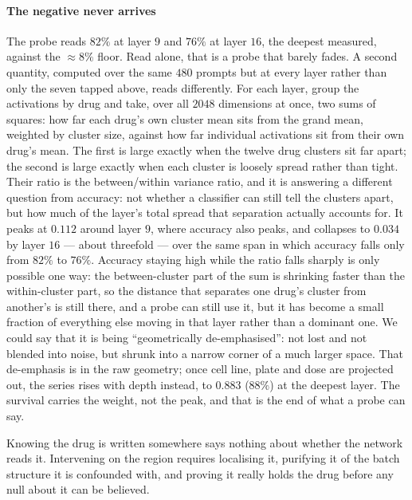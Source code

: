 \paragraph{The negative never arrives} The probe reads $82\%$ at layer $9$ and
$76\%$ at layer $16$, the deepest measured, against the $\approx 8\%$ floor.
Read alone, that is a probe that barely fades. A second quantity, computed over
the same $480$ prompts but at every layer rather than only the seven tapped
above, reads differently. For each layer, group the activations by drug and
take, over all $2048$ dimensions at once, two sums of squares: how far each
drug's own cluster mean sits from the grand mean, weighted by cluster size,
against how far individual activations sit from their own drug's mean. The
first is large exactly when the twelve drug clusters sit far apart; the second
is large exactly when each cluster is loosely spread rather than tight. Their
ratio is the between/within variance ratio, and it is answering a different
question from accuracy: not whether a classifier can still tell the clusters
apart, but how much of the layer's total spread that separation actually
accounts for. It peaks at $0.112$ around layer $9$, where accuracy also peaks,
and collapses to $0.034$ by layer $16$ --- about threefold --- over the same
span in which accuracy falls only from $82\%$ to $76\%$. Accuracy staying high
while the ratio falls sharply is only possible one way: the between-cluster
part of the sum is shrinking faster than the within-cluster part, so the
distance that separates one drug's cluster from another's is still there, and
a probe can still use it, but it has become a small fraction of everything
else moving in that layer rather than a dominant one. We could say that it is being
``geometrically de-emphasised'': not lost and not blended into
noise, but shrunk into a narrow corner of a much larger space. That de-emphasis
is in the raw geometry; once cell line, plate and dose are projected out, the
series rises with depth instead, to $0.883$ ($88\%$) at the deepest layer. The
survival carries the weight, not the peak, and that is the end of what a probe
can say.




\begin{question}[3]
Knowing the drug is written somewhere says nothing about whether the network
reads it. Intervening on the region requires localising it, purifying it of the
batch structure it is confounded with, and proving it really holds the drug
before any null about it can be believed.
\end{question}

